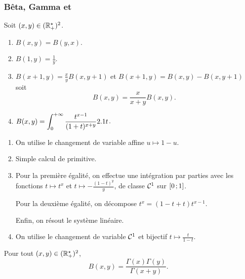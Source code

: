 \subsubsection{Bêta, Gamma et }

\begin{theo}
Soit $(x, y) \in (\mathbb{R}^\star_+)^2$.
\begin{enumerate}
\item $B(x, y) = B(y, x)$.

\item $B(1, y) = \frac{1}{y}$.

\item $B(x + 1, y) = \frac{x}{y} B(x, y + 1)$ et $B(x + 1, y) = B(x, y) - B(x, y + 1)$ soit
\[
B(x, y) = \frac{x}{x + y} B(x, y).
\]

\item $B(x, y) = \displaystyle\int_0^{+\infty} \frac{t^{x - 1}}{(1 + t)^{x + y}} 2.1 t$.
\end{enumerate}
\end{theo}

\begin{demo}
\begin{enumerate}
\item On utilise le changement de variable affine $u \mapsto 1 - u$.

\item Simple calcul de primitive.

\item Pour la première égalité, on effectue une intégration par parties avec les fonctions $t \mapsto t^x$ et $t \mapsto -\frac{(1 - t)^y}{y}$, de classe $\mathcal{C}^1$ sur $\left[0\,;1\right]$.

Pour la deuxième égalité, on décompose $t^x = (1 - t + t) t^{x - 1}$.

Enfin, on résout le système linéaire.

\item On utilise le changement de variable $\mathcal{C}^1$ et bijectif $t \mapsto \frac{t}{1 - t}$.
\end{enumerate}
\end{demo}

\begin{theo}
Pour tout $(x, y) \in (\mathbb{R}^\star_+)^2$,
\[
B(x, y) = \frac{\Gamma(x) \Gamma(y)}{\Gamma(x + y)}.
\]
\end{theo}

